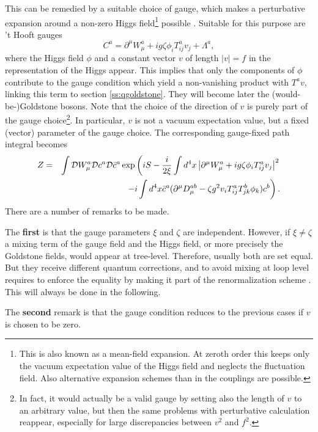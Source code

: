 \documentclass[final,12pt]{article}
\newcommand*{\no}{\noindent}
\newcommand*{\bea}{\begin{eqnarray}}
\newcommand*{\eea}{\end{eqnarray}}
\newcommand*{\be}{\begin{equation}}
\newcommand*{\ee}{\end{equation}}
\newcommand*{\pd}{\partial}
\newcommand*{\nn}{\nonumber}
\newcommand*{\1}{1\!\!\!\bot}
\begin{document}
This can be remedied by a suitable choice of gauge, which makes a perturbative expansion around a non-zero Higgs field\footnote{This is also known as a mean-field expansion. At zeroth order this keeps only the vacuum expectation value of the Higgs field and neglects the fluctuation field. Also alternative expansion schemes than in the couplings are possible.} possible \cite{Lee:1972fj,Lee:1974zg,Lee:1972yfa,Bohm:2001yx}. Suitable for this purpose are 't Hooft gauges \cite{Bohm:2001yx}
\be
C^a=\pd^\mu W_\mu^a+ig\zeta\phi_iT^a_{ij} v_j+\Lambda^a\label{thooftg},
\ee
\no where the Higgs field $\phi$ and a constant vector $v$ of length $|v|=f$ in the representation of the Higgs appear. This implies that only the components of $\phi$ contribute to the gauge condition which yield a non-vanishing product with $T^av$, linking this term to section \ref{ss:qgoldstone}. They will become later the (would-be-)Goldstone bosons. Note that the choice of the direction of $v$ is purely part of the gauge choice\footnote{In fact, it would actually be a valid gauge by setting also the length of $v$ to an arbitrary value, but then the same problems with perturbative calculation reappear, especially for large discrepancies between $v^2$ and $f^2$.}. In particular, $v$ is not a vacuum expectation value, but a fixed (vector) parameter of the gauge choice. The corresponding gauge-fixed path integral becomes
\bea
Z&=&\int{\cal D}W_\mu^a{\cal D}c^a{\cal D}{\bar c}^a\exp\left(iS-\frac{i}{2\xi}\int d^4 x\left|\pd^\mu W_\mu^a+ig\zeta\phi_iT^a_{ij} v_j\right|^2\right.\nn\\
&&\left.-i\int d^4x \bar{c}^a(\pd^\mu D_\mu^{ab}-\zeta g^2 v_iT^a_{ij}T^b_{jk}\phi_k) c^b\right)\label{thla}.
\eea
\no There are a number of remarks to be made.

The {\bf first} is that the gauge parameters $\xi$ and $\zeta$ are independent. However, if $\xi\neq\zeta$ a mixing term of the gauge field and the Higgs field, or more precisely the Goldstone fields, would appear at tree-level. Therefore, usually both are set equal. But they receive different quantum corrections, and to avoid mixing at loop level requires to enforce the equality by making it part of the renormalization scheme \cite{Bohm:2001yx}. This will always be done in the following.

The {\bf second} remark is that the gauge condition reduces to the previous cases if $v$ is chosen to be zero.
\end{document}
